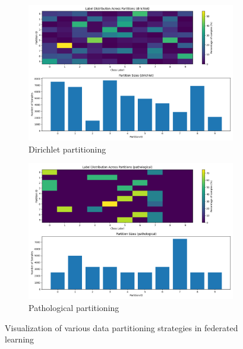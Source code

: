 \documentclass[11pt]{article}
\begin{document}
\begin{figure}[h]
        \begin{subfigure}[b]{0.45\textwidth}
            \centering
            \includegraphics[width=\textwidth]{img/partitions/partition_distribution_dirichlet}
            \caption{Dirichlet partitioning}
            \label{fig:dirichlet_partitioning}
        \end{subfigure}
        \hfill
        \begin{subfigure}[b]{0.45\textwidth}
            \centering
            \includegraphics[width=\textwidth]{img/partitions/partition_distribution_pathological}
            \caption{Pathological partitioning}
            \label{fig:pathological_partitioning}
        \end{subfigure}

        \caption{Visualization of various data partitioning strategies in federated learning}
        \label{fig:partitioning_2x2}
    \end{figure}
\end{document}
